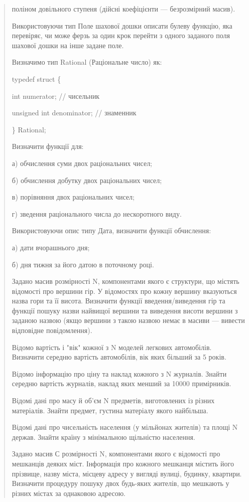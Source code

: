 \documentclass[]{article}
\begin{document}
\begin{quote}
поліном довільного ступеня (дійсні коефіцієнти --- безрозмірний масив).

Використовуючи тип Поле шахової дошки описати булеву функцію, яка
перевіряє, чи може ферзь за один крок перейти з одного заданого поля
шахової дошки на інше задане поле.

Визначимо тип Rational (Раціональне число) як:

typedef struct \{

int numerator; // чисельник

unsigned int denominator; // знаменник

\} Rational;

Визначити функції для:

а) обчислення суми двох раціональних чисел;

б) обчислення добутку двох раціональних чисел;

в) порівняння двох раціональних чисел;

г) зведення раціонального числа до нескоротного виду.

Використовуючи опис типу Дата, визначити функції обчислення:

а) дати вчорашнього дня;

б) дня тижня за його датою в поточному році.

Задано масив розмірності N, компонентами якого є структури, що містять
відомості про вершини гір. У відомостях про кожну вершину вказуються
назва гори та її висота. Визначити функції введення/виведення гір та
функції пошуку назви найвищої вершини та виведення висоти вершини з
заданою назвою (якщо вершини з такою назвою немає в масиви --- вивести
відповідне повідомлення).

Відомо вартість і "вік" кожної з N моделей легкових автомобілів.
Визначити середню вартість автомобілів, вік яких більший за 5 років.

Відомо інформацію про ціну та наклад кожного з N журналів. Знайти
середню вартість журналів, наклад яких менший за 10000 примірників.

Відомі дані про масу й об'єм N предметів, виготовлених із різних
матеріалів. Знайти предмет, густина матеріалу якого найбільша.

Відомі дані про чисельність населення (у мільйонах жителів) та площі N
держав. Знайти країну з мінімальною щільністю населення.

Задано масив С розмірності N, компонентами якого є відомості про
мешканців деяких міст. Інформація про кожного мешканця містить його
прізвище, назву міста, місцеву адресу у вигляді вулиці, будинку,
квартири. Визначити процедуру пошуку двох будь-яких жителів, що мешкають
у різних містах за однаковою адресою.


\end{quote}
\end{document}
